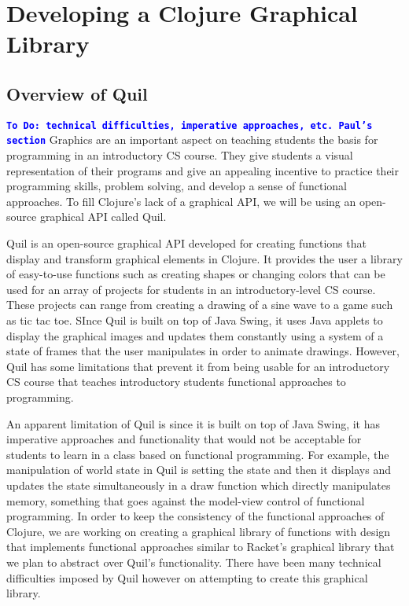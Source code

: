 \documentclass[12pt]{article}
\newcommand{\comment}[1]{{\bf \tt  {#1}}}
\newcommand{\todo}[1]{\textcolor{blue}{\comment{To Do: {#1}}}}
\begin{document}
\section{Developing a Clojure Graphical Library}\label{sec:library}

\subsection{Overview of Quil}\label{subsec:quil}
\todo{technical difficulties, imperative approaches, etc. Paul's section}
Graphics are an important aspect on teaching students the basis for programming in an introductory CS course. They give students a visual representation of their programs and give an appealing incentive to practice their programming skills, problem solving, and develop a sense of functional approaches. To fill Clojure’s lack of a graphical API, we will be using an open-source graphical API called Quil.

Quil is an open-source graphical API developed for creating functions that display and transform graphical elements in Clojure. It provides the user a library of easy-to-use functions such as creating shapes or changing colors that can be used for an array of projects for students in an introductory-level CS course. These projects can range from creating a drawing of a sine wave to a game such as tic tac toe. SInce Quil is built on top of Java Swing, it uses Java applets to display the graphical images and updates them constantly using a system of a state of frames that the user manipulates in order to animate drawings. However, Quil has some limitations that prevent it from being usable for an introductory CS course that teaches introductory students functional approaches to programming.

An apparent limitation of Quil is since it is built on top of Java Swing, it has imperative approaches and functionality that would not be acceptable for students to learn in a class based on functional programming. For example, the manipulation of world state in Quil is setting the state and then it displays and updates the state simultaneously in a draw function which directly manipulates memory, something that goes against the model-view control of functional programming. In order to keep the consistency of the functional approaches of Clojure, we are working on creating a graphical library of functions with design that implements functional approaches similar to Racket’s graphical library that we plan to abstract over Quil’s functionality. There have been many technical difficulties imposed by Quil however on attempting to create this graphical library.
\end{document}
